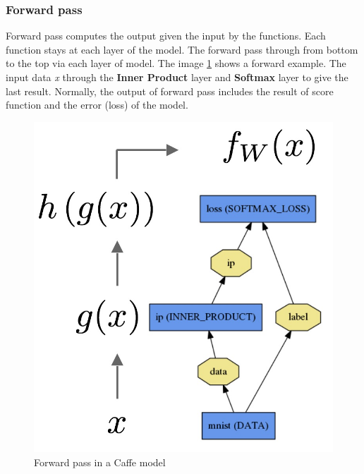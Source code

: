 \subsubsection{Forward pass}
Forward pass computes the output given the input by the functions. Each function stays at each layer of the model. The forward pass through from bottom to the top via each layer of model. The image \ref{figforward} shows a forward example. The input data \textit{x} through the \textbf{Inner Product} layer and \textbf{Softmax} layer to give the last result. Normally, the output of forward pass includes the result of score function and the error (loss) of the model.
\begin{figure}[!h]
	\centering
	\includegraphics[scale=0.45]{images/forward}
	\caption{Forward pass in a Caffe model}
	\label{figforward}
\end{figure}
